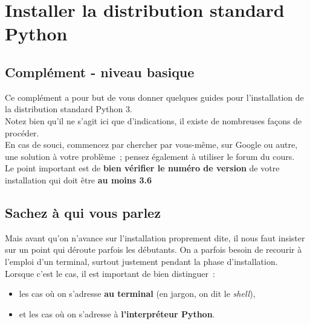     \hypertarget{installer-la-distribution-standard-python}{%
\section{Installer la distribution standard
Python}\label{installer-la-distribution-standard-python}}

    \hypertarget{compluxe9ment---niveau-basique}{%
\subsection{Complément - niveau
basique}\label{compluxe9ment---niveau-basique}}

    Ce complément a pour but de vous donner quelques guides pour
l'installation de la distribution standard Python 3.\\

Notez bien qu'il ne s'agit ici que d'indications, il existe de
nombreuses façons de procéder.\\

En cas de souci, commencez par chercher par vous-même, sur Google ou
autre, une solution à votre problème~; pensez également à utiliser le
forum du cours.\\

    Le point important est de \textbf{bien vérifier le numéro de version} de
votre installation qui doit être \textbf{au moins 3.6}

    \hypertarget{sachez-uxe0-qui-vous-parlez}{%
\subsection{Sachez à qui vous
parlez}\label{sachez-uxe0-qui-vous-parlez}}

    Mais avant qu'on n'avance sur l'installation proprement dite, il nous
faut insister sur un point qui déroute parfois les débutants. On a
parfois besoin de recourir à l'emploi d'un terminal, surtout justement
pendant la phase d'installation.\\

Lorsque c'est le cas, il est important de bien distinguer~:

\begin{itemize}
	\item 
    les cas où on s'adresse \textbf{au terminal} (en jargon, on dit le \emph{shell}),
    \item
    et les cas où on s'adresse à \textbf{l'interpréteur Python}.
\end{itemize}

